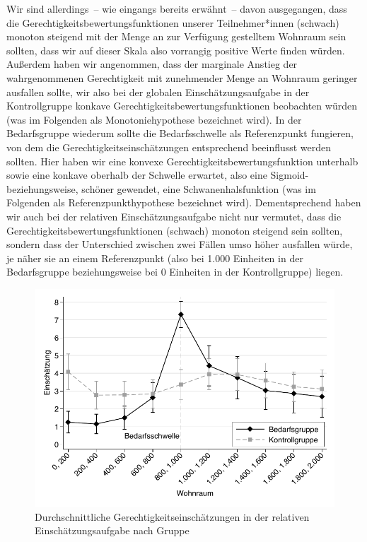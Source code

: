 \documentclass[justified,nobib,symmetric,twoside]{tufte-handout}
\begin{document}
Wir sind allerdings~-- wie eingangs bereits erwähnt~-- davon ausgegangen, dass die Gerechtigkeitsbewertungsfunktionen unserer Teilnehmer*innen (schwach) monoton steigend mit der Menge an zur Verfügung gestelltem Wohnraum sein sollten, dass wir auf dieser Skala also vorrangig positive Werte finden würden.
Außerdem haben wir angenommen, dass der marginale Anstieg der wahrgenommenen Gerechtigkeit mit zunehmender Menge an Wohnraum geringer ausfallen sollte, wir also bei der globalen Einschätzungsaufgabe in der Kontrollgruppe konkave Gerechtigkeitsbewertungsfunktionen beobachten würden (was im Folgenden als Monotoniehypothese bezeichnet wird).
In der Bedarfsgruppe wiederum sollte die Bedarfsschwelle als Referenzpunkt fungieren, von dem die Gerechtigkeitseinschätzungen entsprechend beeinflusst werden sollten.
Hier haben wir eine konvexe Gerechtigkeitsbewertungsfunktion unterhalb sowie eine konkave oberhalb der Schwelle erwartet, also eine Sigmoid- beziehungsweise, schöner gewendet, eine Schwanenhalsfunktion (was im Folgenden als Referenzpunkthypothese bezeichnet wird).
Dementsprechend haben wir auch bei der relativen Einschätzungsaufgabe nicht nur vermutet, dass die Gerechtigkeitsbewertungsfunktionen (schwach) monoton steigend sein sollten, sondern dass der Unterschied zwischen zwei Fällen umso höher ausfallen würde, je näher sie an einem Referenzpunkt (also bei 1.000 Einheiten in der Bedarfsgruppe beziehungsweise bei 0 Einheiten in der Kontrollgruppe) liegen.

\begin{figure}[t]\label{fig:abbildung_2}
   \center
   \includegraphics[width=0.99\linewidth]{figure_2.pdf}
   \caption{Durchschnittliche Gerechtigkeitseinschätzungen in der relativen Einschätzungsaufgabe nach Gruppe}
\end{figure}
\end{document}
